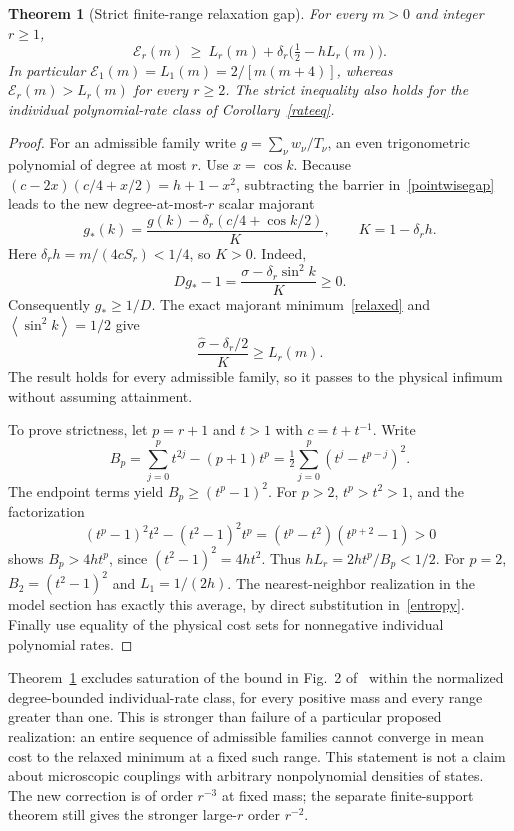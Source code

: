 \documentclass[11pt]{article}
\newtheorem{theorem}{Theorem}
\newcommand{\avg}[1]{\left\langle #1\right\rangle}
\begin{document}
\begin{theorem}[Strict finite-range relaxation gap]\label{finitegapthm}
For every $m>0$ and integer $r\ge1$,
\begin{equation}\label{gapbound}
\mathcal E_r(m)\ \ge\
 L_r(m)+\delta_r\bigl(\tfrac12-hL_r(m)\bigr).
\end{equation}
In particular $\mathcal E_1(m)=L_1(m)=2/[m(m+4)]$, whereas $\mathcal E_r(m)>L_r(m)$ for every $r\ge2$. The strict inequality also holds for the individual polynomial-rate class of Corollary~\ref{rateeq}.
\end{theorem}
\begin{proof}
For an admissible family write $g=\sum_\nu w_\nu/T_\nu$, an even trigonometric polynomial of degree at most $r$. Use $x=\cos k$. Because $(c-2x)(c/4+x/2)=h+1-x^2$, subtracting the barrier in~\eqref{pointwisegap} leads to the new degree-at-most-$r$ scalar majorant
\[
g_*(k)=
\frac{g(k)-\delta_r(c/4+\cos k/2)}{K},
\qquad K=1-\delta_r h.
\]
Here $\delta_r h=m/(4cS_r)<1/4$, so $K>0$. Indeed,
\[
Dg_*-1=\frac{\sigma-\delta_r\sin^2 k}{K}\ge0.
\]
Consequently $g_*\ge1/D$. The exact majorant minimum~\eqref{relaxed} and $\avg{\sin^2 k}=1/2$ give
\[
\frac{\hat\sigma-\delta_r/2}{K}\ge L_r(m).
\]
The result holds for every admissible family, so it passes to the physical infimum without assuming attainment.

To prove strictness, let $p=r+1$ and $t>1$ with $c=t+t^{-1}$. Write
\[
B_p=\sum_{j=0}^p t^{2j}-(p+1)t^p
=\tfrac12\sum_{j=0}^p(t^j-t^{p-j})^2.
\]
The endpoint terms yield $B_p\ge(t^p-1)^2$. For $p>2$, $t^p>t^2>1$, and the factorization
\[
(t^p-1)^2t^2-(t^2-1)^2t^p
=(t^p-t^2)(t^{p+2}-1)>0
\]
shows $B_p>4ht^p$, since $(t^2-1)^2=4ht^2$. Thus $hL_r=2ht^p/B_p<1/2$. For $p=2$, $B_2=(t^2-1)^2$ and $L_1=1/(2h)$. The nearest-neighbor realization in the model section has exactly this average, by direct substitution in~\eqref{entropy}. Finally use equality of the physical cost sets for nonnegative individual polynomial rates.
\end{proof}

Theorem~\ref{finitegapthm} excludes saturation of the bound in Fig.~2 of~\cite{gopal} within the normalized degree-bounded individual-rate class, for every positive mass and every range greater than one. This is stronger than failure of a particular proposed realization: an entire sequence of admissible families cannot converge in mean cost to the relaxed minimum at a fixed such range. This statement is not a claim about microscopic couplings with arbitrary nonpolynomial densities of states. The new correction is of order $r^{-3}$ at fixed mass; the separate finite-support theorem still gives the stronger large-$r$ order $r^{-2}$.
\end{document}
